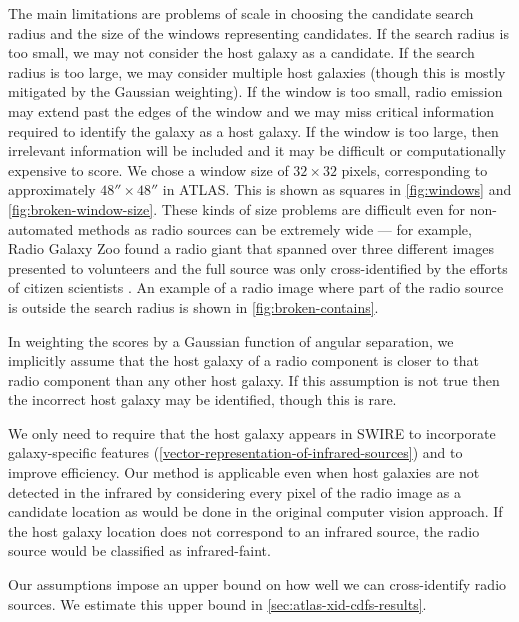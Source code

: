     {The main limitations are problems of scale in choosing the
    candidate search radius and the size of the windows
    representing candidates. If the search radius is too small, we may not
    consider the host galaxy as a candidate. If the search radius is too
    large, we may consider multiple host galaxies (though this is mostly
    mitigated by the Gaussian weighting). If the window is too small, radio
    emission may extend past the edges of the window and we may miss critical
    information required to identify the galaxy as a host galaxy. If the
    window is too large, then irrelevant information will be included and it
    may be difficult or computationally expensive to score. We chose a
    window size of $32 \times 32$ pixels, corresponding to approximately $48'' \times 48''$ in
    ATLAS. This is shown as squares in \autoref{fig:windows} and
    \autoref{fig:broken-window-size}. These kinds of size problems are
    difficult even for non-automated methods as radio sources can be extremely
    wide --- for example, Radio Galaxy Zoo found a radio giant that spanned
    over three different images presented to volunteers and the full source
    was only cross-identified by the efforts of citizen scientists
    \citep{banfield15}. An example of a radio image where part of the radio
    source is outside the search radius is shown in
    \autoref{fig:broken-contains}.}

    In weighting the scores by a Gaussian function of angular
    separation, we implicitly assume that the host galaxy of a radio component
    is closer to that radio component than any other host galaxy. If this
    assumption is not true then the incorrect host galaxy may be identified, though
    this is rare.

    We only need to require that the host galaxy appears in SWIRE to
    incorporate galaxy-specific features
    (\autoref{vector-representation-of-infrared-sources}) and to improve
    efficiency. Our method is applicable even when host galaxies are not detected in
    the infrared by considering every pixel of the radio image as a candidate
    location as would be done in the original computer vision approach. {If the host galaxy location does not correspond to an infrared source, the radio source would be classified as infrared-faint.}

    Our assumptions impose an upper bound on how well we can cross-identify
    radio sources. We estimate this upper bound in \autoref{sec:atlas-xid-cdfs-results}.

